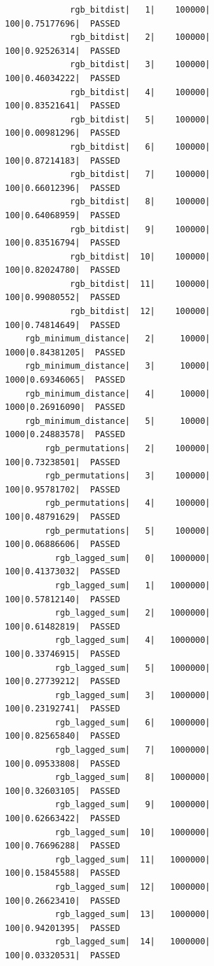 \documentclass[11pt, a4paper, titlepage]{article}
\begin{document}
\begin{figure}[H]
    \fontsize{8pt}{10pt}\selectfont
    \centering
    \begin{verbatim}
             rgb_bitdist|   1|    100000|     100|0.75177696|  PASSED
             rgb_bitdist|   2|    100000|     100|0.92526314|  PASSED
             rgb_bitdist|   3|    100000|     100|0.46034222|  PASSED
             rgb_bitdist|   4|    100000|     100|0.83521641|  PASSED
             rgb_bitdist|   5|    100000|     100|0.00981296|  PASSED
             rgb_bitdist|   6|    100000|     100|0.87214183|  PASSED
             rgb_bitdist|   7|    100000|     100|0.66012396|  PASSED
             rgb_bitdist|   8|    100000|     100|0.64068959|  PASSED
             rgb_bitdist|   9|    100000|     100|0.83516794|  PASSED
             rgb_bitdist|  10|    100000|     100|0.82024780|  PASSED
             rgb_bitdist|  11|    100000|     100|0.99080552|  PASSED
             rgb_bitdist|  12|    100000|     100|0.74814649|  PASSED
    rgb_minimum_distance|   2|     10000|    1000|0.84381205|  PASSED
    rgb_minimum_distance|   3|     10000|    1000|0.69346065|  PASSED
    rgb_minimum_distance|   4|     10000|    1000|0.26916090|  PASSED
    rgb_minimum_distance|   5|     10000|    1000|0.24883578|  PASSED
        rgb_permutations|   2|    100000|     100|0.73238501|  PASSED
        rgb_permutations|   3|    100000|     100|0.95781702|  PASSED
        rgb_permutations|   4|    100000|     100|0.48791629|  PASSED
        rgb_permutations|   5|    100000|     100|0.06886606|  PASSED
          rgb_lagged_sum|   0|   1000000|     100|0.41373032|  PASSED
          rgb_lagged_sum|   1|   1000000|     100|0.57812140|  PASSED
          rgb_lagged_sum|   2|   1000000|     100|0.61482819|  PASSED
          rgb_lagged_sum|   4|   1000000|     100|0.33746915|  PASSED
          rgb_lagged_sum|   5|   1000000|     100|0.27739212|  PASSED
          rgb_lagged_sum|   3|   1000000|     100|0.23192741|  PASSED
          rgb_lagged_sum|   6|   1000000|     100|0.82565840|  PASSED
          rgb_lagged_sum|   7|   1000000|     100|0.09533808|  PASSED
          rgb_lagged_sum|   8|   1000000|     100|0.32603105|  PASSED
          rgb_lagged_sum|   9|   1000000|     100|0.62663422|  PASSED
          rgb_lagged_sum|  10|   1000000|     100|0.76696288|  PASSED
          rgb_lagged_sum|  11|   1000000|     100|0.15845588|  PASSED
          rgb_lagged_sum|  12|   1000000|     100|0.26623410|  PASSED
          rgb_lagged_sum|  13|   1000000|     100|0.94201395|  PASSED
          rgb_lagged_sum|  14|   1000000|     100|0.03320531|  PASSED

\end{verbatim}
\end{figure}
\end{document}

